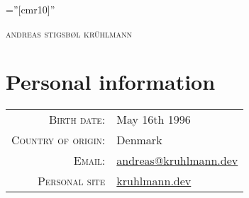 \documentclass[a4paper,10pt]{article}
\begin{document}
\pagestyle{empty}

\font\fb=''[cmr10]''

\par{\centering
		{\Huge \textsc{andreas stigsb\o l kr\"uhlmann}
	}\bigskip\par}

\section{Personal information}
\begin{tabular}{rl}
    \textsc{Birth date:} & May 16th 1996\\
    \textsc{Country of origin:} & Denmark\\
    \textsc{Email:} & \href{mailto:andreas@kruhlmann.dev}{andreas@kruhlmann.dev} \\
    \textsc{Personal site} & \href{https://kruhlmann.dev}{kruhlmann.dev} \\
\end{tabular}
\end{document}

